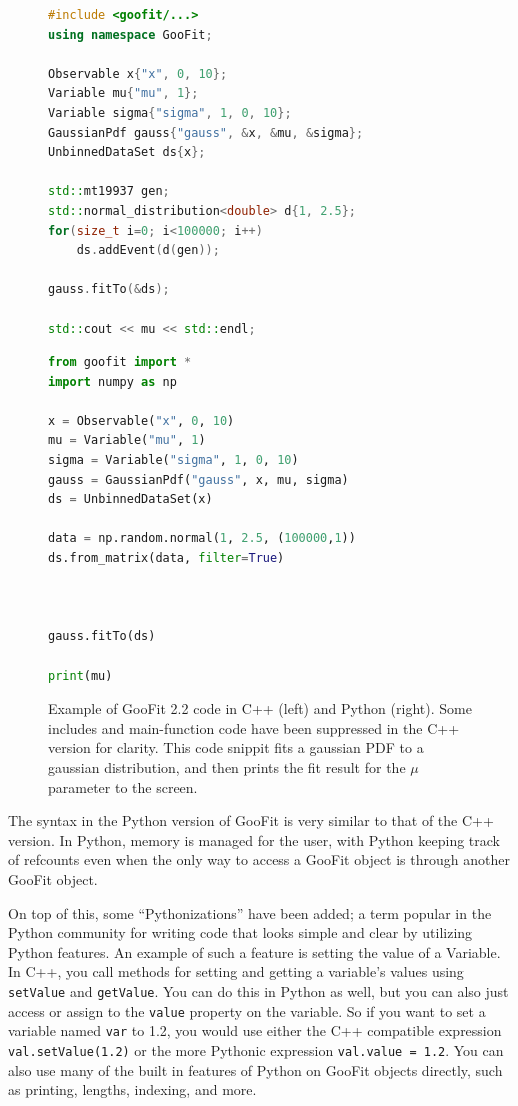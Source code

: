 \documentclass{webofc}
\begin{document}
\begin{figure}[h]
	    \begin{minipage}{.51\textwidth}
		\begin{lstlisting}[language=C++]
#include <goofit/...>
using namespace GooFit;

Observable x{"x", 0, 10};
Variable mu{"mu", 1};
Variable sigma{"sigma", 1, 0, 10};
GaussianPdf gauss{"gauss", &x, &mu, &sigma};
UnbinnedDataSet ds{x};

std::mt19937 gen;
std::normal_distribution<double> d{1, 2.5};
for(size_t i=0; i<100000; i++)
	ds.addEvent(d(gen));

gauss.fitTo(&ds);

std::cout << mu << std::endl;
		\end{lstlisting}
	    \end{minipage}%
	    \begin{minipage}{.49\textwidth}
		\begin{lstlisting}[language=Python] 
from goofit import *
import numpy as np

x = Observable("x", 0, 10)
mu = Variable("mu", 1)
sigma = Variable("sigma", 1, 0, 10)
gauss = GaussianPdf("gauss", x, mu, sigma)
ds = UnbinnedDataSet(x)

data = np.random.normal(1, 2.5, (100000,1))
ds.from_matrix(data, filter=True)



gauss.fitTo(ds)

print(mu)
		\end{lstlisting}
	    \end{minipage}
	\caption{Example of GooFit 2.2 code in C++ (left) and Python (right). Some includes and main-function code have been suppressed in the C++ version for clarity. This code snippit fits a gaussian PDF to a gaussian distribution, and then prints the fit result for the $\mu$ parameter to the screen.}
	\label{fig-code}
\end{figure}

The syntax in the Python version of GooFit is very similar to that of the C++ version. In Python, memory is managed for the user, with Python keeping track of refcounts even when the only way to access a GooFit object is through another GooFit object.

On top of this, some ``Pythonizations'' have been added; a term popular in the Python community for writing code that looks simple and clear by utilizing Python features. An example of such a feature is setting the value of a Variable. In C++, you call  methods for setting and getting a variable's values using \texttt{setValue} and \texttt{getValue}. You can do this in Python as well, but you can also just access or assign to the \texttt{value} property on the variable. So if you want to set a variable named \lstinline|var| to 1.2, you would use either the C++ compatible expression \lstinline|val.setValue(1.2)| or the more Pythonic expression \lstinline|val.value = 1.2|. You can also use many of the built in features of Python on GooFit objects directly, such as printing, lengths, indexing, and more.
\end{document}
